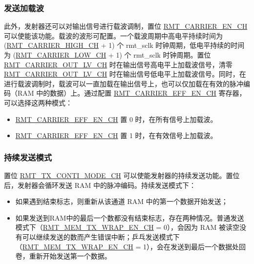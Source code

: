 \documentclass[main\_\_CN.tex]{subfiles}
\begin{document}
\subsubsection{发送加载波}

此外，发射器还可以对输出信号进行载波调制，置位 \hyperref[fielddesc:RMTCARRIERENCHN]{RMT\_CARRIER\_EN\_CH} 可以使能该功能。载波的波形可配置。一个载波周期中高电平持续时间为 (\hyperref[fielddesc:RMTCARRIERHIGHCHN]{RMT\_CARRIER\_HIGH\_CH} + 1) 个 rmt\_sclk 时钟周期，低电平持续的时间为 (\hyperref[fielddesc:RMTCARRIERLOWCHN]{RMT\_CARRIER\_LOW\_CH} + 1) 个 rmt\_sclk 时钟周期。置位 \hyperref[fielddesc:RMTCARRIEROUTLVCHN]{RMT\_CARRIER\_OUT\_LV\_CH} 时在输出信号高电平上加载波信号，清零 \hyperref[fielddesc:RMTCARRIEROUTLVCHN]{RMT\_CARRIER\_OUT\_LV\_CH} 时在输出信号低电平上加载波信号。同时，在进行载波调制时，载波可以一直加载在输出信号上，也可以仅加载在有效的脉冲编码（RAM 中的数据）上。通过配置 \hyperref[fielddesc:RMTCARRIEREFFENCHN]{RMT\_CARRIER\_EFF\_EN\_CH} 寄存器，可以选择这两种模式：
\begin{itemize}
    \item \hyperref[fielddesc:RMTCARRIEREFFENCHN]{RMT\_CARRIER\_EFF\_EN\_CH} 置 0 时，在所有信号上加载波。
    \item \hyperref[fielddesc:RMTCARRIEREFFENCHN]{RMT\_CARRIER\_EFF\_EN\_CH} 置 1 时，在有效信号上加载波。
\end{itemize}


\subsubsection{持续发送模式}

置位 \hyperref[fielddesc:RMTTXCONTIMODECHN]{RMT\_TX\_CONTI\_MODE\_CH} 可以使能发射器的持续发送功能。置位后，发射器会循环发送 RAM 中的脉冲编码。持续发送模式下：
\begin{itemize}
    \item 如果遇到结束标志，则重新从该通道 RAM 中的第一个数据开始发送；
    \item 如果发送到RAM中的最后一个数都没有结束标志，存在两种情况。普通发送模式下（\hyperref[fielddesc:RMTMEMTXWRAPENCHN]{RMT\_MEM\_TX\_WRAP\_EN\_CH} = 0），会因为 RAM 被读空没有可以继续发送的数而产生错误中断；乒乓发送模式下（\hyperref[fielddesc:RMTMEMTXWRAPENCHN]{RMT\_MEM\_TX\_WRAP\_EN\_CH} = 1），会在发送到最后一个数据处回卷，重新开始发送第一个数据。
\end{itemize}
\end{document}

